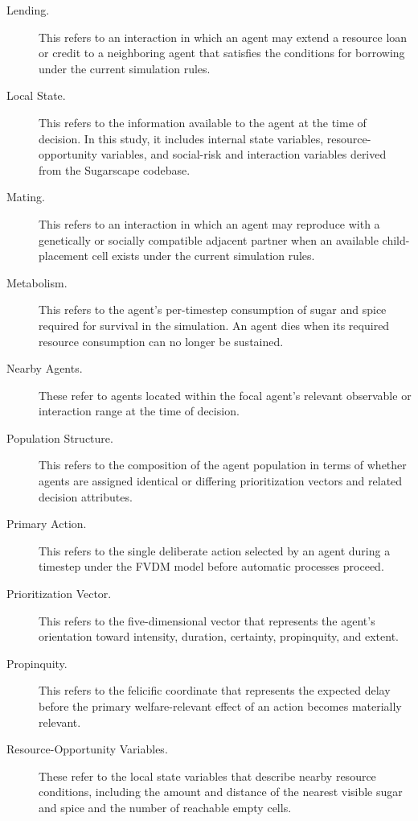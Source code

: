\documentclass{icsthesis}
\begin{document}
\begin{mainmatter}
\begin{description}
\item[Lending.] This refers to an interaction in which an agent may extend a resource loan or credit to a neighboring agent that satisfies the conditions for borrowing under the current simulation rules.

\item[Local State.] This refers to the information available to the agent at the time of decision. In this study, it includes internal state variables, resource-opportunity variables, and social-risk and interaction variables derived from the Sugarscape codebase.

\item[Mating.] This refers to an interaction in which an agent may reproduce with a genetically or socially compatible adjacent partner when an available child-placement cell exists under the current simulation rules.

\item[Metabolism.] This refers to the agent's per-timestep consumption of sugar and spice required for survival in the simulation. An agent dies when its required resource consumption can no longer be sustained.

\item[Nearby Agents.] These refer to agents located within the focal agent's relevant observable or interaction range at the time of decision.

\item[Population Structure.] This refers to the composition of the agent population in terms of whether agents are assigned identical or differing prioritization vectors and related decision attributes.

\item[Primary Action.] This refers to the single deliberate action selected by an agent during a timestep under the FVDM model before automatic processes proceed.

\item[Prioritization Vector.] This refers to the five-dimensional vector that represents the agent's orientation toward intensity, duration, certainty, propinquity, and extent.

\item[Propinquity.] This refers to the felicific coordinate that represents the expected delay before the primary welfare-relevant effect of an action becomes materially relevant.

\item[Resource-Opportunity Variables.] These refer to the local state variables that describe nearby resource conditions, including the amount and distance of the nearest visible sugar and spice and the number of reachable empty cells.


\end{description}
\end{mainmatter}
\end{document}
